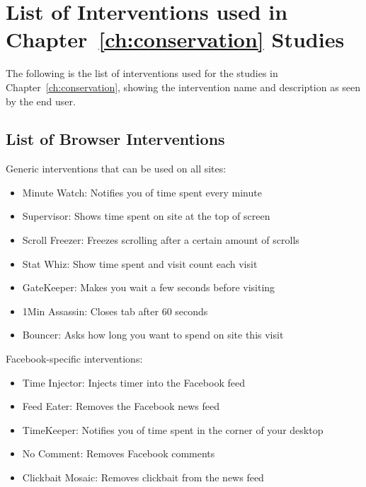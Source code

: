 
\chapter{List of Interventions used in Chapter~\ref{ch:conservation} Studies}


The following is the list of interventions used for the studies in Chapter~\ref{ch:conservation}, showing the intervention name and description as seen by the end user.\\

\section{List of Browser Interventions}

Generic interventions that can be used on all sites:
\begin{small}
\begin{itemize}
    \item Minute Watch: Notifies you of time spent every minute
    \item Supervisor: Shows time spent on site at the top of screen
    \item Scroll Freezer: Freezes scrolling after a certain amount of scrolls
    \item Stat Whiz: Show time spent and visit count each visit
    \item GateKeeper: Makes you wait a few seconds before visiting
    \item 1Min Assassin: Closes tab after 60 seconds
    \item Bouncer: Asks how long you want to spend on site this visit
\end{itemize}
\end{small}
\vspace{2mm}

Facebook-specific interventions:

\begin{itemize}
    \item Time Injector: Injects timer into the Facebook feed
    \item Feed Eater: Removes the Facebook news feed
    \item TimeKeeper: Notifies you of time spent in the corner of your desktop
    \item No Comment: Removes Facebook comments
    \item Clickbait Mosaic: Removes clickbait from the news feed
\end{itemize}


